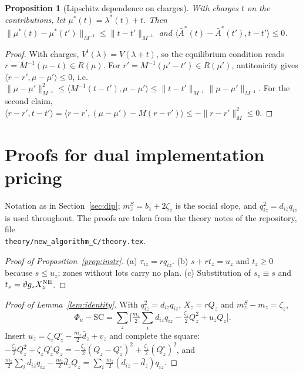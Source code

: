 \documentclass[preprint,12pt]{elsarticle}
\newtheorem{proposition}[theorem]{Proposition}
\theoremstyle{definition}
\theoremstyle{remark}
\newcommand{\Abar}{\bar A}
\newcommand{\ip}[2]{\langle #1,#2\rangle}
\begin{document}
\begin{proposition}[Lipschitz dependence on charges]\label{prop:charges}
With charges $t$ on the contributions, let $\mu^*(t)=\lambda^*(t)+t$. Then $\|\mu^*(t)-\mu^*(t')\|_{M^{-1}}\le\|t-t'\|_{M^{-1}}$ and $\ip{\Abar^*(t)-\Abar^*(t')}{t-t'}\le0$.
\end{proposition}
\begin{proof}
With charges, $V^t(\lambda)=V(\lambda+t)$, so the equilibrium condition reads $r=M^{-1}(\mu-t)\in R(\mu)$. For $r'=M^{-1}(\mu'-t')\in R(\mu')$, antitonicity gives $\ip{r-r'}{\mu-\mu'}\le0$, i.e.\ $\|\mu-\mu'\|^2_{M^{-1}}\le\ip{M^{-1}(t-t')}{\mu-\mu'}\le\|t-t'\|_{M^{-1}}\|\mu-\mu'\|_{M^{-1}}$. For the second claim, $\ip{r-r'}{t-t'}=\ip{r-r'}{(\mu-\mu')-M(r-r')}\le-\|r-r'\|^2_M\le0$.
\end{proof}

\section{Proofs for dual implementation pricing}\label{app:dip}

Notation as in Section~\ref{sec:dip}; $m^S_z=b_z+2\zeta_z$ is the social slope, and $q_{iz}^2=d_{iz}q_{iz}$ is used throughout. The proofs are taken from the theory notes of the repository, file\\ \texttt{theory/new\_algorithm\_C/theory.tex}.

\begin{proof}[Proof of Proposition~\ref{prop:instr}]
(a) $\tau_{iz}=rq_{iz}$. (b) $s+rt_z=u_z$ and $t_z\ge0$ because $s\le u_z$; zones without lots carry no plan. (c) Substitution of $s_z\equiv s$ and $t_z=\vartheta g_zX^{\rm NE}_z$.
\end{proof}

\begin{proof}[Proof of Lemma~\ref{lem:identity}]
With $q_{iz}^2=d_{iz}q_{iz}$, $X_z=rQ_z$ and $m^S_z-m_z=\zeta_z$, \[\Phi_u-\mathrm{SC}=\sum_z\big[\tfrac{m_z}{2}\textstyle\sum_id_{iz}q_{iz}-\tfrac{\zeta_z}{2}Q_z^2+u_zQ_z\big].\] Insert $u_z=\zeta_zQ^\circ_z-\tfrac{m_z}{2}\bar d_z+v_z$ and complete the square: $-\tfrac{\zeta_z}{2}Q_z^2+\zeta_zQ^\circ_zQ_z=-\tfrac{\zeta_z}{2}(Q_z-Q^\circ_z)^2+\tfrac{\zeta_z}{2}(Q^\circ_z)^2$, and $\tfrac{m_z}{2}\sum_id_{iz}q_{iz}-\tfrac{m_z}{2}\bar d_zQ_z=\sum_i\tfrac{m_z}{2}(d_{iz}-\bar d_z)q_{iz}$.
\end{proof}
\end{document}
